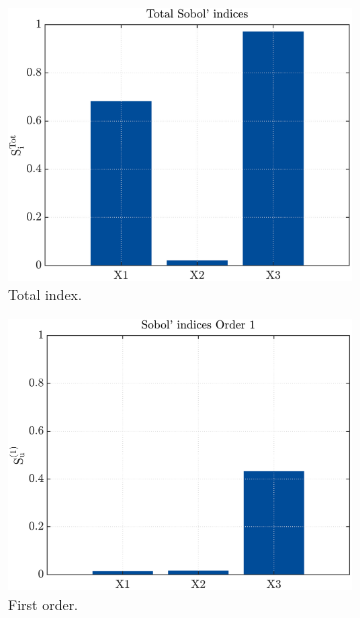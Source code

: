 \documentclass{elsarticle}
\begin{document}
\begin{figure}[hbtp]
\centering
	\begin{subfigure}[b]{.49\textwidth}
	\centering
	\includegraphics[width=\textwidth]{figures/total_type2.pdf}
	\caption{Total index.\label{fig:total_type2}}
	\end{subfigure}
	\hfill
	\begin{subfigure}[b]{.49\textwidth}
	\centering
	\includegraphics[width=\textwidth]{figures/first_type2.pdf}
	\caption{First order.\label{fig:first_type2}}
	\end{subfigure}\\
	\begin{subfigure}[b]{.49\textwidth}

\end{subfigure}
\end{figure}
\end{document}
